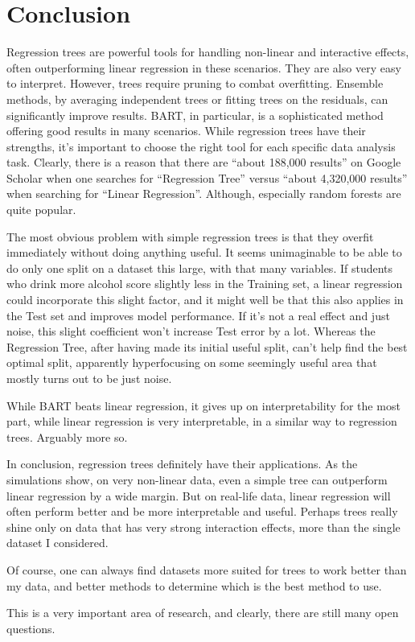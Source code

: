 \documentclass[12pt]{article}
\begin{document}
\section{Conclusion}

Regression trees are powerful tools for handling non-linear and interactive effects, often outperforming linear regression in these scenarios. They are also very easy to interpret. However, trees require pruning to combat overfitting. Ensemble methods, by averaging independent trees or fitting trees on the residuals, can significantly improve results. BART, in particular, is a sophisticated method offering good results in many scenarios. While regression trees have their strengths, it's important to choose the right tool for each specific data analysis task. Clearly, there is a reason that there are ``about 188,000 results'' on Google Scholar when one searches for ``Regression Tree'' versus ``about 4,320,000 results'' when searching for ``Linear Regression''. Although, especially random forests are quite popular.

The most obvious problem with simple regression trees is that they overfit immediately without doing anything useful. It seems unimaginable to be able to do only one split on a dataset this large, with that many variables. If students who drink more alcohol score slightly less in the Training set, a linear regression could incorporate this slight factor, and it might well be that this also applies in the Test set and improves model performance. If it's not a real effect and just noise, this slight coefficient won't increase Test error by a lot. Whereas the Regression Tree, after having made its initial useful split, can't help find the best optimal split, apparently hyperfocusing on some seemingly useful area that mostly turns out to be just noise.

While BART beats linear regression, it gives up on interpretability for the most part, while linear regression is very interpretable, in a similar way to regression trees. Arguably more so.

In conclusion, regression trees definitely have their applications. As the simulations show, on very non-linear data, even a simple tree can outperform linear regression by a wide margin. But on real-life data, linear regression will often perform better and be more interpretable and useful. Perhaps trees really shine only on data that has very strong interaction effects, more than the single dataset I considered. 

Of course, one can always find datasets more suited for trees to work better than my data, and better methods to determine which is the best method to use. 

This is a very important area of research, and clearly, there are still many open questions.


\newpage


\end{document}

